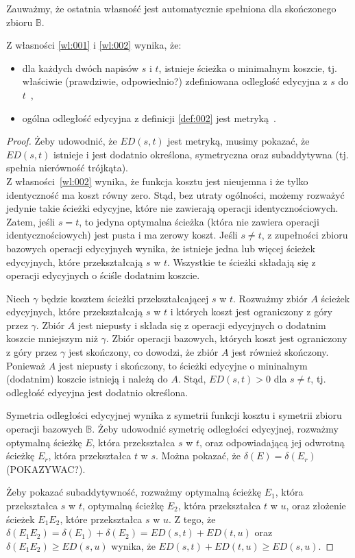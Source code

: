 \documentclass{praca1}
\begin{document}
Zauważmy, że ostatnia własność jest automatycznie spełniona dla skończonego zbioru $\mathbb{B}$.

\begin{theorem}
Z własności \ref{wl:001} i \ref{wl:002} wynika, że:
\begin{itemize}
\item dla każdych dwóch napisów $s$ i $t$, istnieje ścieżka o minimalnym koszcie, tj. właściwie (prawdziwie, odpowiednio?) zdefiniowana odleglość edycyjna z $s$ do $t$~\cite{Boytsov2011:indexingmethods},
\item ogólna odległość edycyjna z definicji \ref{def:002} jest metryką~\cite{Wagner1974:stringtostring}.
\end{itemize}
\end{theorem}

\begin{proof}
Żeby udowodnić, że $ED(s,t)$ jest metryką, musimy pokazać, że $ED(s,t)$ istnieje i jest dodatnio określona, symetryczna oraz subaddytywna (tj. spełnia nierówność trójkąta).\\
Z własności~\ref{wl:002} wynika, że funkcja kosztu jest nieujemna i że tylko identyczność ma koszt równy zero. Stąd, bez utraty ogólności, możemy rozważyć jedynie takie ścieżki edycyjne, które nie zawierają operacji identycznościowych. Zatem, jeśli $s=t$, to jedyna optymalna ścieżka (która nie zawiera operacji identycznościowych) jest pusta i ma zerowy koszt. Jeśli $s\neq t$, z zupełności zbioru bazowych operacji edycyjnych wynika, że istnieje jedna lub więcej ścieżek edycyjnych, które przekształcają $s$ w $t$. Wszystkie te ścieżki składają się z operacji edycyjnych o ściśle dodatnim koszcie.

Niech $\gamma$ będzie kosztem ścieżki przekształcającej $s$ w $t$. Rozważmy zbiór $A$ ścieżek edycyjnych, które przekształcają $s$ w $t$ i których koszt jest ograniczony z góry przez $\gamma$. Zbiór $A$ jest niepusty i składa się z operacji edycyjnych o dodatnim koszcie mniejszym niż $\gamma$. Zbiór operacji bazowych, których koszt jest ograniczony z góry przez $\gamma$ jest skończony, co dowodzi, że zbiór $A$ jest również skończony. Ponieważ $A$ jest niepusty i skończony, to ścieżki edycyjne o mininalnym (dodatnim) koszcie istnieją i należą do $A$. Stąd, $ED(s,t) > 0$ dla $s\neq t$, tj. odległość edycyjna jest dodatnio określona.

Symetria odległości edycyjnej wynika z symetrii funkcji kosztu i symetrii zbioru operacji bazowych $\mathbb{B}$. Żeby udowodnić symetrię odległości edycyjnej, rozważmy optymalną ścieżkę $E$, która przekształca $s$ w $t$, oraz odpowiadającą jej odwrotną ścieżkę $E_r$, która przekształca $t$ w $s$. Można pokazać, że $\delta(E) = \delta(E_r)$ (POKAZYWAC?).

Żeby pokazać subaddytywność, rozważmy optymalną ścieżkę $E_1$, która przekształca $s$ w $t$, optymalną ścieżkę $E_2$, która przekształca $t$ w $u$, oraz złożenie ścieżek $E_1E_2$, które przekształca $s$ w $u$. Z tego, że $\delta(E_1E_2) = \delta(E_1) + \delta(E_2) = ED(s,t)+ED(t,u)$ oraz $\delta(E_1E_2) \geq ED(s,u)$ wynika, że $ED(s,t)+ED(t,u) \geq ED(s,u)$.
\end{proof}
\end{document}
